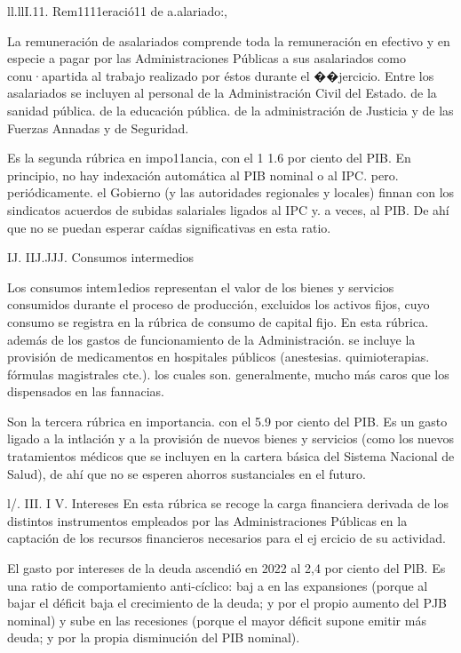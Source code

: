 \documentclass[10pt,a4paper]{article}
\begin{document}
ll.llI.11. Rem1111eració11 de a.\·alariado:,

La remuneración de asalariados comprende toda la remuneración en efectivo y en especie a pagar por las Administraciones Públicas a sus asalariados como conu·apartida al trabajo realizado por éstos durante el ��jercicio. Entre los asalariados se incluyen al personal de la Administración Civil del Estado. de la sanidad pública. de la educación pública. de la administración de Justicia y de las Fuerzas Annadas y de Seguridad.

Es la segunda rúbrica en impo11ancia, con el 1 1.6 por ciento del PIB. En principio, no hay indexación automática al PIB nominal o al IPC. pero. periódicamente. el Gobierno (y las autoridades regionales y locales) finnan con los sindicatos acuerdos de subidas salariales ligados al IPC y. a veces, al PIB. De ahí que no se puedan esperar caídas significativas en esta ratio.

IJ. IIJ.JJJ. Consumos intermedios

Los consumos intem1edios representan el valor de los bienes y servicios consumidos durante el proceso de producción, excluidos los activos fijos, cuyo consumo se registra en la rúbrica de consumo de capital fijo. En esta rúbrica. además de los gastos de funcionamiento de la Administración. se incluye la provisión de medicamentos en hospitales públicos (anestesias. quimioterapias. fórmulas magistrales cte.). los cuales son. generalmente, mucho más caros que los dispensados en las fannacias.

Son la tercera rúbrica en importancia. con el 5.9 por ciento del PIB. Es un gasto ligado a la intlación y a la provisión de nuevos bienes y servicios (como los nuevos tratamientos médicos que se incluyen en la cartera básica del Sistema Nacional de Salud), de ahí que no se esperen ahorros sustanciales en el futuro.

l/. III. I V. Intereses 
En esta rúbrica se recoge la carga financiera derivada de los distintos instrumentos empleados por las Administraciones Públicas en la captación de los recursos financieros necesarios para el ej ercicio de su actividad.

El gasto por intereses de la deuda ascendió en 2022 al 2,4 por ciento del PlB. Es una ratio de comportamiento anti-cíclico: baj a en las expansiones (porque al bajar el déficit baja el crecimiento de la deuda; y por el propio aumento del PJB nominal) y sube en las recesiones (porque el mayor déficit supone emitir más deuda; y por la propia disminución del PIB nominal). 
\end{document}
